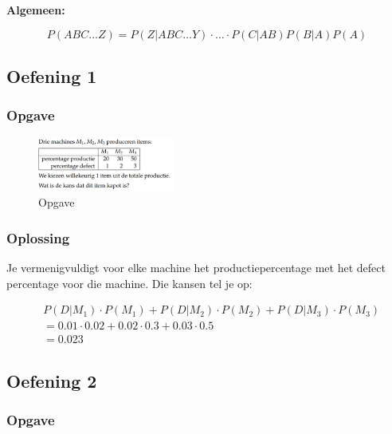 \documentclass{article}
\begin{document}
\textbf{Algemeen:}

\begin{equation}
    P(ABC\dots Z) = P(Z|ABC\dots Y) \cdot \dots \cdot P (C| A B ) P (B|A) P(A)
\end{equation}

\subsection{Oefening 1}

\subsubsection{Opgave}

\begin{figure}[H]
    \centering
    \includegraphics[width=0.4\textwidth]{voorwaardelijke-kans-oef1.png}
    \caption{Opgave}
\end{figure}

\subsubsection{Oplossing}

Je vermenigvuldigt voor elke machine het productiepercentage met het defect percentage voor die machine. 
Die kansen tel je op:

\begin{center}
    \begin{align*}
        & P(D | M_1) \cdot P(M_1) + P(D | M_2) \cdot P(M_2) + P(D | M_3) \cdot P(M_3)\\
        & = 0.01 \cdot 0.02 + 0.02 \cdot 0.3 + 0.03 \cdot 0.5 \\
        & = 0.023
    \end{align*}
\end{center}

\subsection{Oefening 2}

\subsubsection{Opgave}
\end{document}
